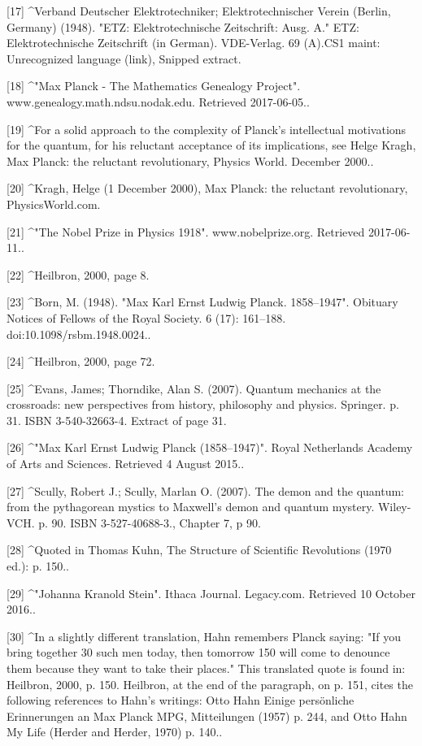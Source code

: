 [17]
^Verband Deutscher Elektrotechniker; Elektrotechnischer Verein (Berlin, Germany) (1948). "ETZ: Elektrotechnische Zeitschrift: Ausg. A." ETZ: Elektrotechnische Zeitschrift (in German). VDE-Verlag. 69 (A).CS1 maint: Unrecognized language (link), Snipped extract.

[18]
^"Max Planck - The Mathematics Genealogy Project". www.genealogy.math.ndsu.nodak.edu. Retrieved 2017-06-05..

[19]
^For a solid approach to the complexity of Planck's intellectual motivations for the quantum, for his reluctant acceptance of its implications, see Helge Kragh, Max Planck: the reluctant revolutionary, Physics World. December 2000..

[20]
^Kragh, Helge (1 December 2000), Max Planck: the reluctant revolutionary, PhysicsWorld.com.

[21]
^"The Nobel Prize in Physics 1918". www.nobelprize.org. Retrieved 2017-06-11..

[22]
^Heilbron, 2000, page 8.

[23]
^Born, M. (1948). "Max Karl Ernst Ludwig Planck. 1858–1947". Obituary Notices of Fellows of the Royal Society. 6 (17): 161–188. doi:10.1098/rsbm.1948.0024..

[24]
^Heilbron, 2000, page 72.

[25]
^Evans, James; Thorndike, Alan S. (2007). Quantum mechanics at the crossroads: new perspectives from history, philosophy and physics. Springer. p. 31. ISBN 3-540-32663-4. Extract of page 31.

[26]
^"Max Karl Ernst Ludwig Planck (1858–1947)". Royal Netherlands Academy of Arts and Sciences. Retrieved 4 August 2015..

[27]
^Scully, Robert J.; Scully, Marlan O. (2007). The demon and the quantum: from the pythagorean mystics to Maxwell's demon and quantum mystery. Wiley-VCH. p. 90. ISBN 3-527-40688-3., Chapter 7, p 90.

[28]
^Quoted in Thomas Kuhn, The Structure of Scientific Revolutions (1970 ed.): p. 150..

[29]
^"Johanna Kranold Stein". Ithaca Journal. Legacy.com. Retrieved 10 October 2016..

[30]
^In a slightly different translation, Hahn remembers Planck saying: "If you bring together 30 such men today, then tomorrow 150 will come to denounce them because they want to take their places." This translated quote is found in: Heilbron, 2000, p. 150. Heilbron, at the end of the paragraph, on p. 151, cites the following references to Hahn’s writings: Otto Hahn Einige persönliche Erinnerungen an Max Planck MPG, Mitteilungen (1957) p. 244, and Otto Hahn My Life (Herder and Herder, 1970) p. 140..

